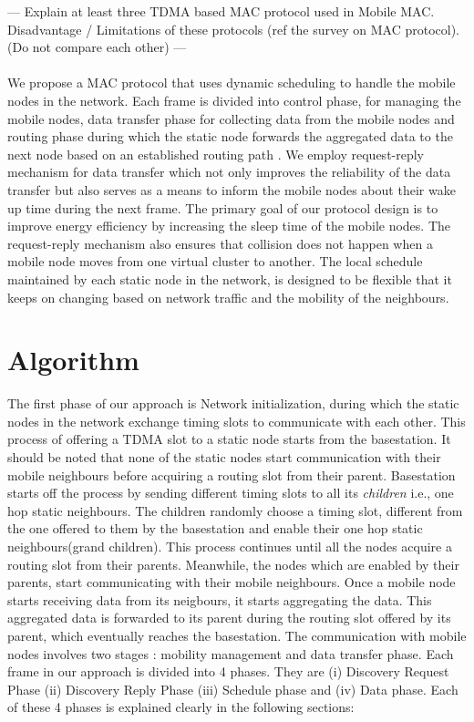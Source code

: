 \documentclass[a4paper, conference, 10pt]{IEEEtran}
\begin{document}
--- Explain at least three TDMA based MAC protocol used in Mobile MAC. Disadvantage / Limitations of these protocols (ref the survey on MAC protocol). (Do not compare each other) ---\\ \\

We propose a MAC protocol that uses dynamic scheduling to handle the mobile nodes in the network. Each frame is divided into control phase, for managing the mobile nodes, data transfer phase for collecting data from the mobile nodes and routing phase during which the static node forwards the aggregated data to the next node based on an established routing path \cite{aodv}. We employ request-reply mechanism for data transfer which not only improves the reliability of the data transfer but also serves as a means to inform the mobile nodes about their wake up time during the next frame. The primary goal of our protocol design is to improve energy efficiency by increasing the sleep time of the mobile nodes. The request-reply mechanism also ensures that collision does not happen when a mobile node moves from one virtual cluster \cite{smac} to another. The local schedule maintained by each static node in the network, is designed to be flexible that it keeps on changing based on network traffic and the mobility of the neighbours.


\section{Algorithm}
\label{algo}

The first phase of our approach is Network initialization, during which the static nodes in the network exchange timing slots to communicate with each other. This process of offering a TDMA slot to a static node starts from the basestation. It should be noted that none of the static nodes start communication with their mobile neighbours before acquiring a routing slot from their parent. Basestation starts off the process by sending different timing slots to all its \emph{children} i.e., one hop static neighbours. The children randomly choose a timing slot, different from the one offered to them by the basestation and enable their one hop static neighbours(grand children). This process continues until all the nodes acquire a routing slot from their parents. Meanwhile, the nodes which are enabled by their parents, start communicating with their mobile neighbours. Once a mobile node starts receiving data from its neigbours, it starts aggregating the data. This aggregated data is forwarded to its parent during the routing slot offered by its parent, which eventually reaches the basestation. The communication with mobile nodes involves two stages : mobility management and data transfer phase. Each frame in our approach is divided into 4 phases. They are (i) Discovery Request Phase (ii) Discovery Reply Phase (iii) Schedule phase and (iv) Data phase. Each of these 4 phases is explained clearly in the following sections:\\
\end{document}
